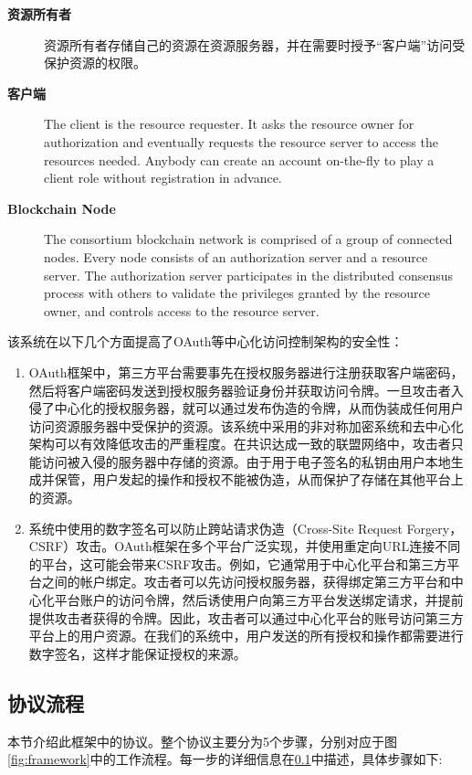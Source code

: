 \begin{description}
  \item[\textbf{资源所有者}] 资源所有者存储自己的资源在资源服务器，并在需要时授予“客户端”访问受保护资源的权限。
  \item[\textbf{客户端}] The client is the resource requester. It asks the resource owner for authorization and eventually requests the resource server to access the resources needed. Anybody can create an account on-the-fly to play a client role without registration in advance.
  \item[\textbf{Blockchain Node}] The consortium blockchain network is comprised of a group of connected nodes. Every node consists of an authorization server and a resource server. The authorization server participates in the distributed consensus process with others to validate the privileges granted by the resource owner, and controls access to the resource server.
\end{description}

该系统在以下几个方面提高了OAuth等中心化访问控制架构的安全性：

\begin{enumerate}
  \item OAuth框架中，第三方平台需要事先在授权服务器进行注册获取客户端密码，然后将客户端密码发送到授权服务器验证身份并获取访问令牌。一旦攻击者入侵了中心化的授权服务器，就可以通过发布伪造的令牌，从而伪装成任何用户访问资源服务器中受保护的资源。该系统中采用的非对称加密系统和去中心化架构可以有效降低攻击的严重程度。在共识达成一致的联盟网络中，攻击者只能访问被入侵的服务器中存储的资源。由于用于电子签名的私钥由用户本地生成并保管，用户发起的操作和授权不能被伪造，从而保护了存储在其他平台上的资源。

  \item 系统中使用的数字签名可以防止跨站请求伪造（Cross-Site Request Forgery，CSRF）攻击。OAuth框架在多个平台广泛实现，并使用重定向URL连接不同的平台，这可能会带来CSRF攻击。例如，它通常用于中心化平台和第三方平台之间的帐户绑定。攻击者可以先访问授权服务器，获得绑定第三方平台和中心化平台账户的访问令牌，然后诱使用户向第三方平台发送绑定请求，并提前提供攻击者获得的令牌。因此，攻击者可以通过中心化平台的账号访问第三方平台上的用户资源。在我们的系统中，用户发送的所有授权和操作都需要进行数字签名，这样才能保证授权的来源。
\end{enumerate}

\subsection{协议流程}
\label{sec:protocols}
本节介绍此框架中的协议。整个协议主要分为5个步骤，分别对应于图\ref{fig:framework}中的工作流程。每一步的详细信息在\ref{sec:protocols}中描述，具体步骤如下:

